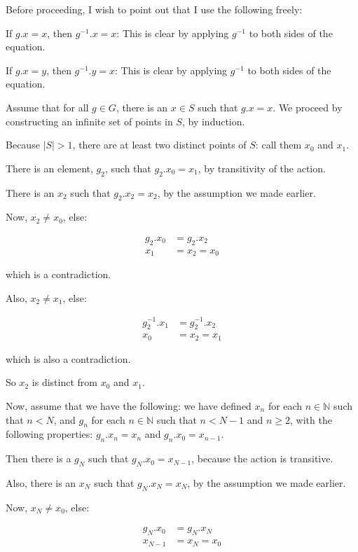 \documentclass[a4paper,12pt]{article}
\newcommand{\tab}{\hspace{4mm}} %
\newcommand{\absval}[1]{\lvert #1 \rvert}
\newcommand{\N}{\mathbb{N}}
\begin{document}
Before proceeding, I wish to point out that I use the following freely:

\tab If $g.x = x$, then $g^{-1}.x=x$: This is clear by applying $g^{-1}$ to both sides of the equation.

\tab If $g.x=y$, then $g^{-1}.y=x$: This is clear by applying $g^{-1}$ to both sides of the equation.

Assume that for all $g \in G$, there is an $x \in S$ such that $g.x=x$. We proceed by constructing an infinite set of points in $S$, by induction.

\tab Because $\absval{S} >1$, there are at least two distinct points of $S$: call them $x_0$ and $x_1$.

\tab There is an element, $g_2$, such that $g_2.x_0=x_1$, by transitivity of the action.

\tab There is an $x_2$ such that $g_2.x_2 = x_2$, by the assumption we made earlier.

\tab Now, $x_2 \neq x_0$, else:

\begin{align*}
g_2.x_0 &= g_2.x_2\\
x_1&= x_2=x_0
\end{align*}

\tab which is a contradiction.

\tab Also, $x_2 \neq x_1$, else:

\begin{align*}
g_2^{-1}.x_1 &= g_2^{-1}.x_2\\
x_0&= x_2=x_1
\end{align*} 

\tab which is also a contradiction.

\tab So $x_2$ is distinct from $x_0$ and $x_1$.

\tab Now, assume that we have the following: we have defined $x_n$ for each $n \in \N$ such that $n < N$, and $g_n$ for each $n \in \N$ such that $n < N-1$ and $n \geq 2$, with the following properties: $g_n.x_n = x_n$ and $g_n.x_0 = x_{n-1}$.

\tab Then there is a $g_N$ such that $g_N.x_0 = x_{N-1}$, because the action is transitive.

\tab Also, there is an $x_N$ such that $g_N.x_N = x_N$, by the assumption we made earlier.

\tab Now, $x_N \neq x_0$, else:

\begin{align*}
g_N.x_0 &= g_N.x_N\\
x_{N-1}&= x_N=x_0
\end{align*}
\end{document}
